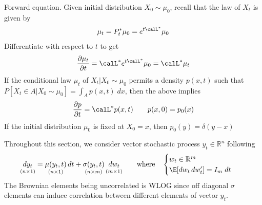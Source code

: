 \documentclass[12pt]{article}
\theoremstyle{plain}
\theoremstyle{definition}
\theoremstyle{remark}
\newcommand{\Rn}{\mathbb{R}^n}
\newcommand{\Rm}{\mathbb{R}^m}
\begin{document}
Forward equation.
Given initial distribution $X_0\sim\mu_0$, recall that the law of $X_t$
is given by
\begin{align*}
  \mu_t
  =P_t^*\mu_0
  =
  e^{t\calL^*}\mu_0
\end{align*}
Differentiate with respect to $t$ to get
\begin{align*}
  \frac{\partial \mu_t}{\partial t}
  =
  \calL^* e^{t\calL^*}\mu_0
  =
  \calL^* \mu_t
\end{align*}
If the conditional law $\mu_t$ of $X_t|X_0\sim \mu_0$ permits a density
$p(x,t)$ such that $P[X_t\in A|X_0\sim\mu_0]=\int_A p(x,t)\;dx$, then
the above implies
\begin{align*}
  \frac{\partial p}{\partial t}
  =
  \calL^* p(x,t)
  \qquad
  p(x,0)=p_0(x)
\end{align*}
If the initial distribution $\mu_0$ is fixed at $X_0=x$, then
$p_0(y)=\delta(y-x)$

\clearpage
Throughout this section, we consider vector stochastic process
$y_t\in\Rn$ following
\begin{align}
  \underset{(n\times 1)}{%
    dy_t
    \vphantom{y}
  }
  &=
  \underset{(n\times 1)}{%
    \mu(y_t,t)
    \vphantom{y}
  }
  \,dt
  +
  \underset{(n\times m)}{%
    \sigma(y_t,t)
  }
  \,
  \underset{(m\times 1)}{%
    dw_t
    \vphantom{\mu}
  }
  \qquad\text{where}\quad
  \begin{cases}
    w_t\in\Rm \\
    \E[dw_t\,dw_t']
    =
    I_m\;dt
  \end{cases}
  \label{sdemulti}
\end{align}
The Brownian elements being uncorrelated is WLOG since off diagonal
$\sigma$ elements can induce correlation between different elements of
vector $y_t$.
\end{document}
